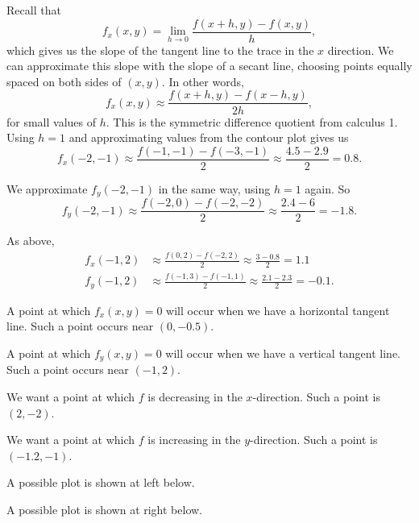 \begin{activitySolution}
\ba
\item Recall that 
\[f_x(x,y) = \lim_{h \to 0} \frac{f(x+h,y) - f(x,y)}{h},\]
which gives us the slope of the tangent line to the trace in the $x$ direction. We can approximate this slope with the slope of a secant line, choosing points equally spaced on both sides of $(x,y)$. In other words,
\[f_x(x,y) \approx \frac{f(x+h,y) - f(x-h,y)}{2h},\]
for small values of $h$. This is the symmetric difference quotient from calculus 1. 
Using $h=1$ and approximating values from the contour plot gives us  
\[f_x(-2, -1) \approx \frac{f(-1,-1)-f(-3,-1)}{2} \approx \frac{4.5-2.9}{2} = 0.8.\] 
\item We approximate $f_y(-2,-1)$ in the same way, using $h=1$ again. So 
\[f_y(-2,-1) \approx \frac{f(-2,0)-f(-2,-2)}{2} \approx \frac{2.4-6}{2} = -1.8.\]
\item As above, 
\begin{align*}
f_x(-1,2) &\approx \frac{f(0,2)-f(-2,2)}{2} \approx \frac{3-0.8}{2} = 1.1 \\
f_y(-1,2) &\approx \frac{f(-1,3)-f(-1,1)}{2} \approx \frac{2.1-2.3}{2} = -0.1.
\end{align*}
\item A point at which $f_x(x,y) = 0$ will occur when we have a horizontal tangent line. Such a point occurs near $(0,-0.5)$. 
\item A point at which $f_y(x,y) = 0$ will occur when we have a vertical tangent line. Such a point occurs near $(-1,2)$. 
\item We want a point at which $f$ is decreasing in the $x$-direction. Such a point is $(2,-2)$.
\item We want a point at which $f$ is increasing in the $y$-direction. Such a point is $(-1.2,-1)$.
\item A possible plot is shown at left below.
\item A possible plot is shown at right below.
    \begin{center}

\end{center}
\end{activitySolution}
